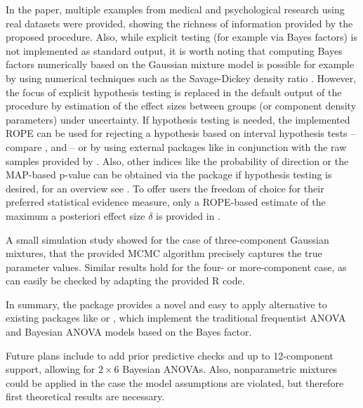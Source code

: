 In the paper, multiple examples from medical and psychological research using real datasets were provided, showing the richness of information provided by the proposed procedure. Also, while explicit testing (for example via Bayes factors) is not implemented as standard output, it is worth noting that computing Bayes factors numerically based on the Gaussian mixture model is possible for example by using numerical techniques such as the Savage-Dickey density ratio \citep{Kelter2021,Wagenmakers2010,Dickey1970,Verdinelli1995}. However, the focus of explicit hypothesis testing is replaced in the default output of the procedure by estimation of the effect sizes between groups (or component density parameters) under uncertainty. If hypothesis testing is needed, the implemented ROPE can be used for rejecting a hypothesis based on interval hypothesis tests -- compare \cite{Kelter2021BMCHodgesLehmann}, \cite{Linde2020ROPE} and \cite{Kruschke2018a} -- or by using external packages like  \citep{Makowski2019a} in conjunction with the raw samples provided by . Also, other indices like the probability of direction \citep{Makowski2019} or the MAP-based p-value \citep{Mills2018} can be obtained via the package  \citep{Makowski2019a} if hypothesis testing is desired, for an overview see \cite{Kelter2021}. To offer users the freedom of choice for their preferred statistical evidence measure, only a ROPE-based estimate of the maximum a posteriori effect size $\delta$ is provided in .

A small simulation study showed for the case of three-component Gaussian mixtures, that the provided MCMC algorithm precisely captures the true parameter values. Similar results hold for the four- or more-component case, as can easily be checked by adapting the provided R code.

In summary, the  package provides a novel and easy to apply alternative to existing packages like  \citep{RProgrammingLanguage} or  \citep{BayesFactorPackage}, which implement the traditional frequentist ANOVA and Bayesian ANOVA models based on the Bayes factor.

Future plans include to add prior predictive checks and up to 12-component support, allowing for $2\times 6$ Bayesian ANOVAs. Also, nonparametric mixtures could be applied in the case the model assumptions are violated, but therefore first theoretical results are necessary.




